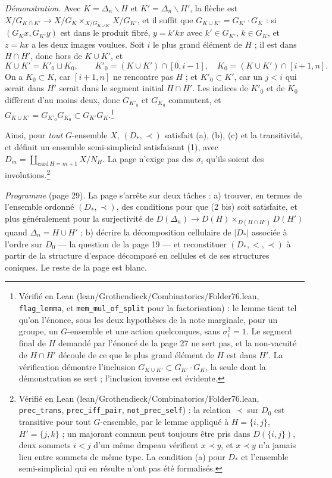 \documentclass[11pt,a4paper]{article}
\begin{document}
\emph{Démonstration.} Avec $K = \Delta_n \smallsetminus H$ et $K' = \Delta_n
\smallsetminus H'$, la flèche est $X/G_{K \cap K'} \to X/G_K \times_{X/G_{K
\cup K'}} X/G_{K'}$, et il suffit que $G_{K \cup K'} = G_{K'} \cdot G_K$ :
si $(G_Kx, G_{K'}y)$ est dans le produit fibré, $y = k'kx$ avec $k' \in
G_{K'}$, $k \in G_K$, et $z = kx$ a les deux images voulues. Soit $i$ le plus
grand élément de $H$ ; il est dans $H \cap H'$, donc hors de $K \cup K'$, et
\[
  K \cup K' = K'_0 \sqcup K_0, \qquad K'_0 = (K \cup K') \cap [0, i-1],
  \quad K_0 = (K \cup K') \cap [i+1, n] .
\]
On a $K_0 \subset K$, car $[i+1, n]$ ne rencontre pas $H$ ; et $K'_0 \subset
K'$, car un $j < i$ qui serait dans $H'$ serait dans le segment initial $H
\cap H'$. Les indices de $K'_0$ et de $K_0$ diffèrent d'au moins deux, donc
$G_{K'_0}$ et $G_{K_0}$ commutent, et $G_{K \cup K'} = G_{K'_0} G_{K_0}
\subset G_{K'} G_K$.\footnote{Vérifié en Lean
(lean/Grothendieck/Combinatorics/Folder76.lean, \texttt{flag\_lemma}, et
\texttt{mem\_mul\_of\_split} pour la factorisation) : le lemme tient tel qu'on
l'énonce, sous les deux hypothèses de la note marginale, pour un groupe, un
$G$-ensemble et une action quelconques, sans $\sigma_i^2 = 1$. Le segment final
de $H$ demandé par l'énoncé de la page 27 ne sert pas, et la non-vacuité de $H
\cap H'$ découle de ce que le plus grand élément de $H$ est dans $H'$. La
vérification démontre l'inclusion $G_{K \cup K'} \subset G_{K'} \cdot G_K$,
la seule dont la démonstration se sert ; l'inclusion inverse est évidente.}

Ainsi, pour \emph{tout} $G$-ensemble $X$, $(D_*, \prec)$ satisfait (a), (b),
(c) et la transitivité, et définit un ensemble semi-simplicial satisfaisant
(1), avec $D_m = \coprod_{\mathrm{card}\, H = m+1} X/N_H$. La page n'exige pas
des $\sigma_i$ qu'ils soient des involutions.\footnote{Vérifié en Lean
(lean/Grothendieck/Combinatorics/Folder76.lean, \texttt{prec\_trans}, \texttt{prec\_iff\_pair},
\texttt{not\_prec\_self}) : la relation $\prec$ sur $D_0$ est transitive pour
tout $G$-ensemble, par le lemme appliqué à $H = \{i, j\}$, $H' = \{j, k\}$ ; un
majorant commun peut toujours être pris dans $D(\{i, j\})$, deux sommets $i <
j$ d'un même drapeau vérifient $x \prec y$, et $x \prec y$ n'a jamais lieu
entre sommets de même type. La condition (a) pour $D_*$ et l'ensemble
semi-simplicial qui en résulte n'ont pas été formalisés.}

\emph{Programme} (page 29). La page s'arrête sur deux tâches : a) trouver,
en termes de l'ensemble ordonné $(D_*, \prec)$, des conditions pour que (2
bis) soit satisfaite, et plus généralement pour la surjectivité de $D(\Delta_n)
\to D(H) \times_{D(H \cap H')} D(H')$ quand $\Delta_n = H \cup H'$ ; b)
décrire la décomposition cellulaire de $|D_*|$ associée à l'ordre sur $D_0$ ---
la question de la page 19 --- et reconstituer $(D_*, <, \prec)$ à partir de la
structure d'espace décomposé en cellules et de ses structures coniques. Le
reste de la page est blanc.
\end{document}
